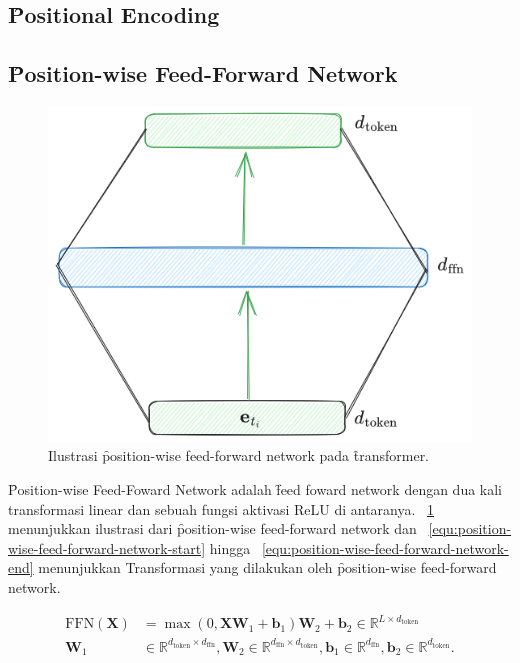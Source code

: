 	\subsection{\f{Positional Encoding}}

	\subsection{\f{Position-wise Feed-Forward Network}}

	\begin{figure}
		\centering
		\includegraphics[width=1\textwidth]{assets/pics/ffn_transformer.png}
		\caption{Ilustrasi \f{position-wise feed-forward network} pada \f{transformer}.}
		\label{fig:position-wise-feed-forward-network}
	\end{figure}

	\f{Position-wise Feed-Foward Network} adalah \f{feed foward network} dengan dua kali transformasi linear dan sebuah fungsi aktivasi ReLU di antaranya. \pic~\ref{fig:position-wise-feed-forward-network} menunjukkan ilustrasi dari \f{position-wise feed-forward network} dan \equ~\ref{equ:position-wise-feed-forward-network-start} hingga \equ~\ref{equ:position-wise-feed-forward-network-end} menunjukkan Transformasi yang dilakukan oleh \f{position-wise feed-forward network}.

	\begin{align}
		\label{equ:position-wise-feed-forward-network-start}
		\text{FFN}(\mathbf{X}) &= \max(0, \mathbf{X}\mathbf{W}_1 + \mathbf{b}_1)\mathbf{W}_2 + \mathbf{b}_2 \in \mathbb{R}^{L \times d_{\text{token}}} \\
		\label{equ:position-wise-feed-forward-network-end}
		\mathbf{W}_1 &\in \mathbb{R}^{d_{\text{token}} \times d_{\text{ffn}}}, \mathbf{W}_2 \in \mathbb{R}^{d_{\text{ffn}} \times d_{\text{token}}}, \mathbf{b}_1 \in \mathbb{R}^{d_{\text{ffn}}}, \mathbf{b}_2 \in \mathbb{R}^{d_{\text{token}}}.
	\end{align}

